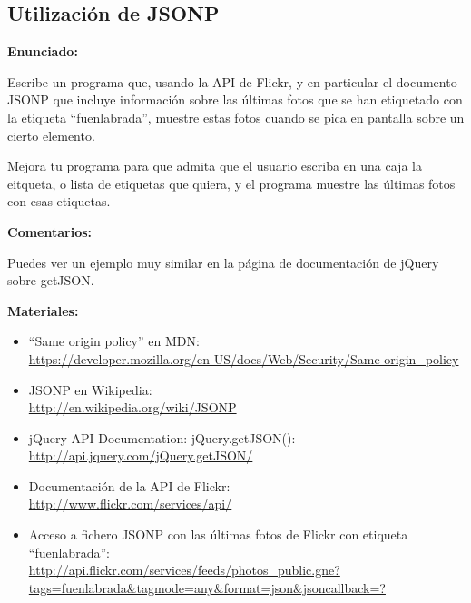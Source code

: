 \subsection{Utilización de JSONP}
\label{subsec:eje-jquery-jsonp}

\textbf{Enunciado:}

Escribe un programa que, usando la API de Flickr, y en particular el documento JSONP que incluye información sobre las últimas fotos que se han etiquetado con la etiqueta ``fuenlabrada'', muestre estas fotos cuando se pica en pantalla sobre un cierto elemento.

Mejora tu programa para que admita que el usuario escriba en una caja la eitqueta, o lista de etiquetas que quiera, y el programa muestre las últimas fotos con esas etiquetas.

\textbf{Comentarios:}

Puedes ver un ejemplo muy similar en la página de documentación de jQuery sobre getJSON.

\textbf{Materiales:}

\begin{itemize}
\item ``Same origin policy'' en MDN: \\
  \url{https://developer.mozilla.org/en-US/docs/Web/Security/Same-origin_policy}
\item JSONP en Wikipedia: \\
  \url{http://en.wikipedia.org/wiki/JSONP}
\item jQuery API Documentation: jQuery.getJSON(): \\
  \url{http://api.jquery.com/jQuery.getJSON/}
\item Documentación de la API de Flickr: \\
  \url{http://www.flickr.com/services/api/}
\item Acceso a fichero JSONP con las últimas fotos de Flickr con etiqueta ``fuenlabrada'': \\
  \url{http://api.flickr.com/services/feeds/photos_public.gne?tags=fuenlabrada&tagmode=any&format=json&jsoncallback=?}
\end{itemize}


